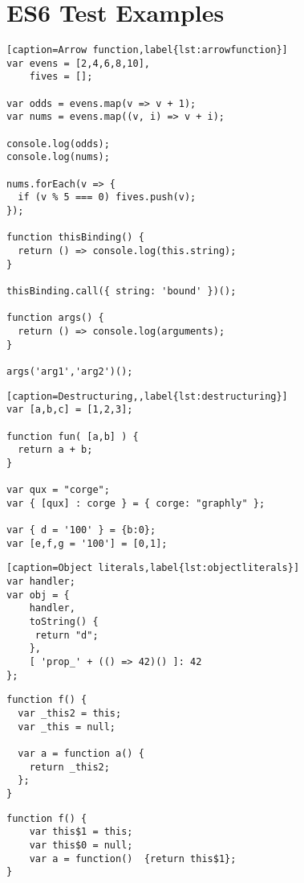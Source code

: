
\chapter{ES6 Test Examples} %

\label{AppendixC} %


\begin{lstlisting}[caption=Arrow function,label{lst:arrowfunction}]
var evens = [2,4,6,8,10],
    fives = [];

var odds = evens.map(v => v + 1);
var nums = evens.map((v, i) => v + i);

console.log(odds);
console.log(nums);

nums.forEach(v => {
  if (v % 5 === 0) fives.push(v);
});

function thisBinding() {
  return () => console.log(this.string);
}

thisBinding.call({ string: 'bound' })();

function args() {
  return () => console.log(arguments);
}

args('arg1','arg2')();
\end{lstlisting}

\begin{lstlisting}[caption=Destructuring,,label{lst:destructuring}]
var [a,b,c] = [1,2,3];

function fun( [a,b] ) {
  return a + b;
}

var qux = "corge";
var { [qux] : corge } = { corge: "graphly" };

var { d = '100' } = {b:0};
var [e,f,g = '100'] = [0,1];
\end{lstlisting}

\begin{lstlisting}[caption=Object literals,label{lst:objectliterals}]
var handler;
var obj = {
    handler,
    toString() {
     return "d";
    },
    [ 'prop_' + (() => 42)() ]: 42
};
\end{lstlisting}

\begin{lstlisting}[caption=Babel JS]
function f() {
  var _this2 = this;
  var _this = null;

  var a = function a() {
    return _this2;
  };
}
\end{lstlisting}

\begin{lstlisting}[caption=ES6 Transpiler]
function f() {
	var this$1 = this;
  	var this$0 = null;
  	var a = function()  {return this$1};
}
\end{lstlisting}
